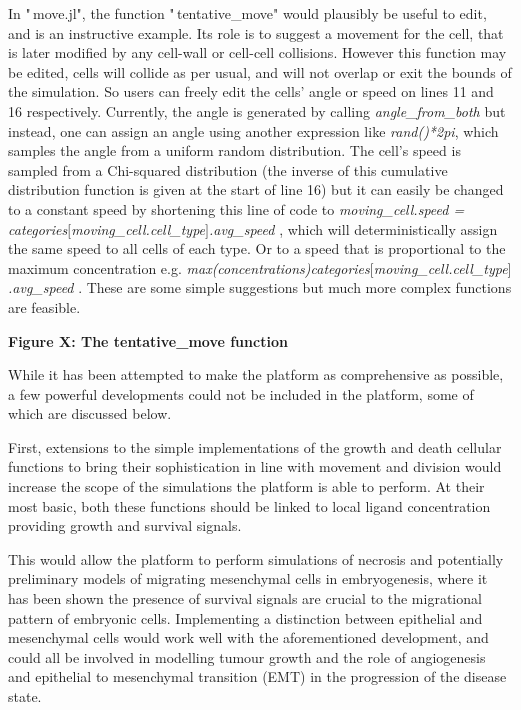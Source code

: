 \documentclass[11.5pt]{article}
\begin{document}
In "\,move.jl", the function "\,tentative\_move" would plausibly be 
useful to edit, and is an instructive example. Its role is to suggest a 
movement for the cell, that is later modified by any cell-wall or 
cell-cell collisions. However this function may be edited, cells will 
collide as per usual, and will not overlap or exit the bounds of the 
simulation. So users can freely edit the cells' angle or speed on lines 
11 and 16 respectively. Currently, the angle is generated by calling 
{\itshape angle\_from\_both} but instead, one can assign an angle using 
another expression like {\itshape rand()*2pi}, which samples the angle 
from a uniform random distribution. The cell's speed is sampled from a 
Chi-squared distribution (the inverse of this cumulative distribution 
function is given at the start of line 16) but it can easily be changed 
to a constant speed by shortening this line of code to {\itshape 
moving\_cell.speed = categories$[$moving\_cell.cell\_type$]$.avg\_speed
}, which will deterministically assign the same speed to all cells of 
each type. Or to a speed that is proportional to the maximum 
concentration e.g. {\itshape 
max(concentrations)categories$[$moving\_cell.cell\_type$]$.avg\_speed}
. These are some simple suggestions but much more complex functions are 
feasible.



\begin{figure}[H]
\centering
\end{figure}


{\bfseries Figure X: The tentative\_move function}



While it has been attempted to make the platform as comprehensive as 
possible, a few powerful developments could not be included in the 
platform, some of which are discussed below. 



First, extensions to the simple implementations of the growth and death 
cellular functions to bring their sophistication in line with movement 
and division would increase the scope of the simulations the platform is 
able to perform. At their most basic, both these functions should be 
linked to local ligand concentration providing growth and survival 
signals. 



This would allow the platform to perform simulations of necrosis and 
potentially preliminary models of migrating mesenchymal cells in 
embryogenesis, where it has been shown the presence of survival signals 
are crucial to the migrational pattern of embryonic cells. Implementing 
a distinction between epithelial and mesenchymal cells would work well 
with the aforementioned development, and could all be involved in 
modelling tumour growth and the role of angiogenesis and epithelial to 
mesenchymal transition (EMT) in the progression of the disease state.
\end{document}
